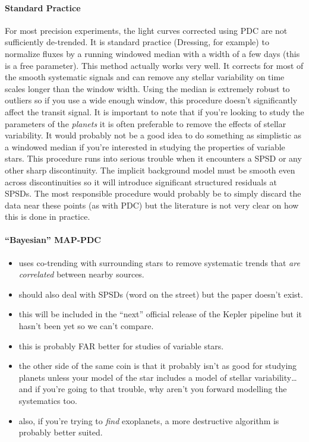 \documentclass[letterpaper,12pt]{article}
\begin{document}
\paragraph{Standard Practice}
For most precision experiments, the light curves corrected using PDC are not
sufficiently de-trended.
It is standard practice (Dressing, for example) to normalize fluxes by a
running windowed median with a width of a few days (this is a free parameter).
This method actually works very well.
It corrects for most of the smooth systematic signals and can remove any
stellar variability on time scales longer than the window width.
Using the median is extremely robust to outliers so if you use a wide enough
window, this procedure doesn't significantly affect the transit signal.
It is important to note that if you're looking to study the parameters of the
\emph{planets} it is often preferable to remove the effects of stellar
variability.
It would probably not be a good idea to do something as simplistic as a
windowed median if you're interested in studying the properties of variable
stars.
This procedure runs into serious trouble when it encounters a SPSD or any
other sharp discontinuity.
The implicit background model must be smooth even across discontinuities so it
will introduce significant structured residuals at SPSDs.
The most responsible procedure would probably be to simply discard the data
near these points (as with PDC) but the literature is not very clear on how
this is done in practice.


\paragraph{``Bayesian'' MAP-PDC}
\begin{itemize}
\item uses co-trending with surrounding stars to remove systematic trends that
\emph{are correlated} between nearby sources.
\item should also deal with SPSDs (word on the street) but the paper doesn't
exist.
\item this will be included in the ``next'' official release of the Kepler
pipeline but it hasn't been yet so we can't compare.
\item this is probably FAR better for studies of variable stars.
\item the other side of the same coin is that it probably isn't as good for
studying planets unless your model of the star includes a model of stellar
variability\ldots and if you're going to that trouble, why aren't you forward
modelling the systematics too.
\item also, if you're trying to \emph{find} exoplanets, a more destructive
algorithm is probably better suited.
\end{itemize}
\end{document}
